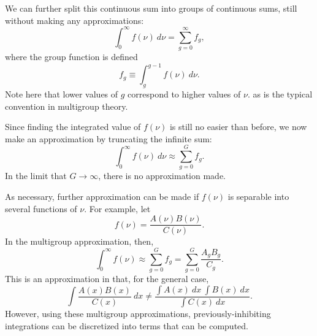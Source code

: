 We can further split this continuous sum into groups of continuous sums,
still without making any approximations:
\[\int_0^\infty f(\nu)\ d\nu = \sum_{g=0}^\infty f_g,\]
where the group function is defined
\[f_g\equiv\int_g^{g-1} f(\nu)\ d\nu.\]
Note here that lower values of $g$ correspond to higher values of $\nu$.  as is the 
typical convention in multigroup theory.

Since finding the integrated value of $f(\nu)$ is still no easier than before,
we now make an approximation by truncating the infinite sum:
\[\int_0^\infty f(\nu)\ d\nu \approx \sum_{g=0}^G f_g.\]
In the limit that $G\to\infty$, there is no approximation made.

As necessary, further approximation can be made if $f(\nu)$ is separable into
several functions of $\nu$.  For example, let
\[f(\nu) = \frac{A(\nu)B(\nu)}{C(\nu)}.\]
In the multigroup approximation, then,
\[\int_0^\infty f(\nu) \approx \sum_{g=0}^G f_g
   = \sum_{g=0}^G \frac{A_gB_g}{C_g}.\]
This is an approximation in that, for the general case,
\[\int \frac{A(x)B(x)}{C(x)}\ dx
   \neq \frac{\int A(x)\ dx\ \int B(x)\ dx}{\int C(x)\ dx}.\]
However, using these multigroup approximations, previously-inhibiting
integrations can be discretized into terms that can be computed.

